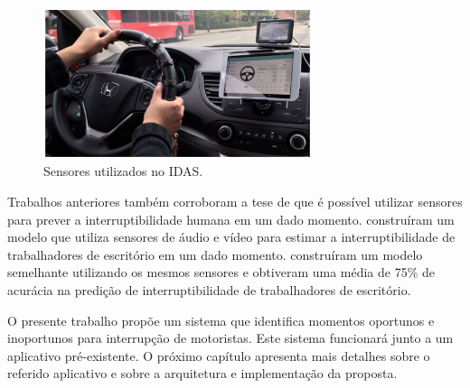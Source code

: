 \begin{figure}[htb]
\centering
\includegraphics[width=0.7\textwidth]{images/idas.png}
\caption{Sensores utilizados no IDAS. \cite{park2016integrated}}
\label{idas}
\end{figure}

Trabalhos anteriores também corroboram a tese de que é possível utilizar sensores para prever a interruptibilidade
humana em um dado momento.  construíram um modelo que utiliza sensores de áudio e vídeo
para estimar a interruptibilidade de trabalhadores de escritório em um dado momento. 
construíram um modelo semelhante utilizando os mesmos sensores e obtiveram uma média de 75\% de acurácia na predição de
interruptibilidade de trabalhadores de escritório.

O presente trabalho propõe um sistema que identifica momentos oportunos e inoportunos para interrupção de motoristas.
Este sistema funcionará junto a um aplicativo pré-existente. O próximo capítulo apresenta mais detalhes sobre o referido
aplicativo e sobre a arquitetura e implementação da proposta.
